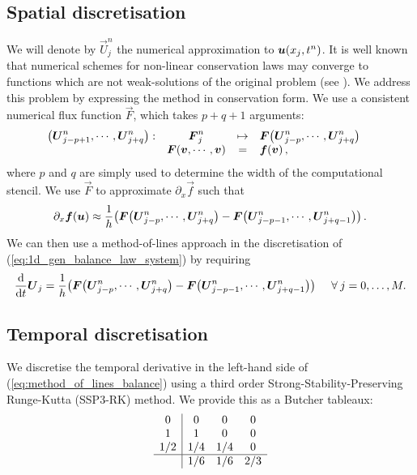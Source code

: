 \documentclass{amsart}
\theoremstyle{definition}
\theoremstyle{remark}
\numberwithin{equation}{section}
\begin{document}
\subsection{Spatial discretisation}
We will denote by $\vec{U}^n_j$ the numerical approximation to $\boldsymbol{u}\!\left({x_j, t^n}\right)$.  
It is well known that numerical schemes for
non-linear conservation laws may converge to functions which are not weak-solutions of the original problem (see \cite[\S12.1]{leveque1992numerical}). We address this problem by expressing the method in conservation form. We use a consistent numerical flux
function $\vec{F}$, which takes $p+q+1$ arguments:
\begin{equation}\label{eq_defn_num_flux}
 \begin{array}{rccl} {\ensuremath{\!\left({\boldsymbol{U}^n_{j-p+1},\cdots,\boldsymbol{U}^n_{j+q}}\right)}}: & {\boldsymbol{F}^n_j} &\mapsto&{{\boldsymbol{F}}\!\left({\boldsymbol{U}^n_{j-p},\cdots,\boldsymbol{U}^n_{j+q}}\right)} \\ & {\boldsymbol{F}\!\left({\boldsymbol{v},\cdots,\boldsymbol{v}}\right)} &=&{\boldsymbol{f}\!\left({\boldsymbol{v}}\right), } \end{array}\quad
\end{equation}
where $p$ and $q$ are simply used to determine the width of the
computational stencil.  We use $\vec{F}$ to approximate
$\partial_{x}\vec{f}$ such that
\begin{equation}\label{eq_num_approx_f}
\partial_{x}\boldsymbol{f}\!\left({\boldsymbol{u}}\right)\approx \frac{1}{h}\!\left({{\boldsymbol{F}\!\left({\boldsymbol{U}^n_{j-p},\cdots,\boldsymbol{U}^n_{j+q}}\right)}-{\boldsymbol{F}\!\left({\boldsymbol{U}^n_{j-p-1},\cdots,\boldsymbol{U}^n_{j+q-1}}\right)}}\right).
\end{equation}
We can then use a method-of-lines approach in the discretisation of
(\ref{eq:1d_gen_balance_law_system}) by requiring
\begin{equation}\label{eq:method_of_lines_balance}
\frac{\mathrm{d}}{\mathrm{d}t}\boldsymbol{U}_j =  \frac{1}{h}\!\left({{\boldsymbol{F}\!\left({\boldsymbol{U}^n_{j-p},\cdots,\boldsymbol{U}^n_{j+q}}\right)}-{\boldsymbol{F}\!\left({\boldsymbol{U}^n_{j-p-1},\cdots,\boldsymbol{U}^n_{j+q-1}}\right)}}\right) \quad\:\forall\: j=0, \dots, M.
\end{equation}


\subsection{Temporal discretisation}
We discretise the temporal derivative in the left-hand side of (\ref{eq:method_of_lines_balance}) using a third order  Strong-Stability-Preserving Runge-Kutta (SSP3-RK) method.  We provide this as a Butcher tableaux:
\begin{equation}\label{defn:SSP3-temp}
\begin{array}{c|ccc}0&0&0&0\\1&1&0&0\\1/2&1/4&1/4&0\\\hline &1/6&1/6&2/3\\\end{array}
\end{equation} 
\end{document}
